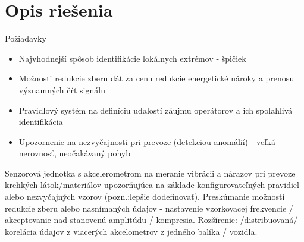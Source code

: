 \chapter{Opis riešenia}
Požiadavky
\begin{itemize}
\item Najvhodnejší spôsob identifikácie lokálnych extrémov - špičiek
\item Možnosti redukcie zberu dát za cenu redukcie energetické nároky a prenosu významných čŕt signálu
\item Pravidlový systém na definíciu udalostí záujmu operátorov a ich spoľahlivá identifikácia
\item Upozornenie na nezvyčajnosti pri prevoze (detekciou anomálií) - veľká nerovnosť, neočakávaný pohyb
\end{itemize}

Senzorová jednotka s akcelerometrom na meranie vibrácii a nárazov pri prevoze krehkých látok/materiálov upozorňujúca na základe konfigurovateľných pravidiel alebo nezvyčajných vzorov (pozn.:lepšie dodefinovať). Preskúmanie možností redukcie zberu alebo nasnímaných údajov - nastavenie vzorkovacej frekvencie / akceptovanie nad stanovenú amplitúdu / kompresia. Rozšírenie: /distribuovaná/ korelácia údajov z viacerých akcelometrov z jedného balíka / vozidla.




